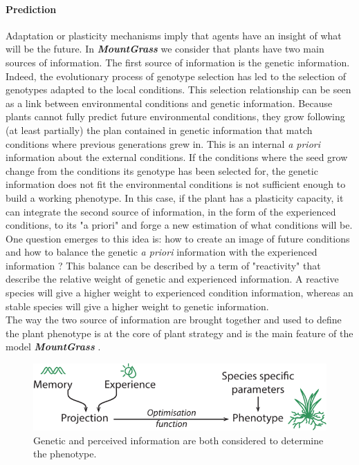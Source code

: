 \documentclass[a4paper,twoside, justified,marginals=raggedright, nobib]{tufte-handout}
\newcommand{\model}{\textit{\textbf{MountGrass }}}
\begin{document}
\paragraph{Prediction} Adaptation or plasticity mechanisms imply that agents have an insight of what will be the future. In \model we consider that plants have two main sources of information. The first source of information is the genetic information. Indeed, the evolutionary process of genotype selection has led to the selection of genotypes adapted to the local conditions. This selection relationship can be seen as a link between environmental conditions and genetic information. Because plants cannot fully predict future environmental conditions, they grow following (at least partially) the plan contained in genetic information that match conditions where previous generations grew in.  This is an internal \textit{a priori} information about the external conditions. If the conditions where the seed grow change from the conditions its genotype has been selected for, the genetic information does not fit the environmental conditions is not sufficient enough to build a working phenotype. In this case, if the plant has a plasticity capacity, it can integrate the second source of information, in the form of the experienced conditions, to its "a priori" and forge a new estimation of what conditions will be. One question emerges to this idea is: how to create an image of future conditions and how to balance the genetic \textit{a priori} information with the experienced information ? This balance can be described by a term of "reactivity" that describe the relative weight of genetic and experienced information. A reactive species will give a higher weight to experienced condition information, whereas an stable species will give a higher weight to genetic information.\\
\indent The way the two source of information are brought together and used to define the plant phenotype is at the core of plant strategy and is the main feature of the model \model.
\begin{figure}
\includegraphics{./Figures/memory2phenotype_t.pdf}
\caption{Genetic and perceived information are both considered to determine the phenotype.}
\end{figure}
\end{document}
